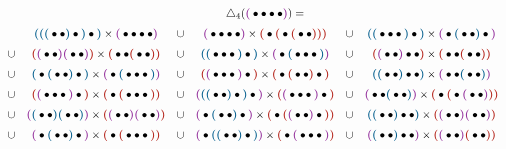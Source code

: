 \documentclass[twoside, 12pt]{amsart}
\theoremstyle{remark}
\begin{document}
\begin{equation*}
  \renewcommand*{\arraystretch}{1.5}
  \begin{matrix}
      & & & & \triangle_4(\purple{\bullet \bullet \bullet \bullet}) =  \\
      &  & \blue{\blue{\blue{\bullet \bullet}\bullet}\bullet} \times \purple{\bullet \bullet \bullet \bullet} 
      & \cup & \purple{\bullet \bullet \bullet \bullet} \times \red{\bullet \red{\bullet \red{\bullet \bullet}}}
      & \cup & \blue{\blue{\bullet \bullet \bullet}\bullet} \times \purple{\bullet \blue{\bullet \bullet}\bullet} \\ 
      & \cup & \red{\purple{\bullet \bullet}\purple{\bullet \bullet}} \times \red{\bullet \bullet\red{\bullet \bullet}} 
      & \cup & \blue{\blue{\bullet \bullet \bullet}\bullet} \times \purple{\bullet \blue{\bullet \bullet \bullet}} 
      & \cup & \red{\purple{\bullet \bullet}\bullet \bullet} \times \red{\bullet \bullet\red{\bullet \bullet}} \\
      & \cup & \blue{\bullet \blue{\bullet \bullet}\bullet} \times \purple{\bullet \blue{\bullet \bullet \bullet}} 
      & \cup & \red{\purple{\bullet \bullet \bullet}\bullet} \times \red{\bullet \red{\bullet \bullet}\bullet}
      & \cup & \blue{\blue{\bullet \bullet}\bullet \bullet} \times \purple{\bullet \bullet \blue{\bullet \bullet}} \\
      & \cup & \red{\purple{\bullet \bullet \bullet}\bullet} \times \red{\bullet \red{\bullet \bullet \bullet}} %
      & \cup & \purple{\blue{\blue{\bullet \bullet}\bullet}\bullet} \times \red{\purple{\bullet \bullet \bullet}\bullet}
      & \cup & \purple{\bullet \bullet\blue{\bullet \bullet}} \times \red{\bullet \red{\bullet \purple{\bullet \bullet}}} \\
      & \cup & \purple{\blue{\bullet \bullet}\blue{\bullet \bullet}} \times \red{\purple{\bullet \bullet}\purple{\bullet \bullet}}
      & \cup & \purple{\bullet \blue{\bullet \bullet}\bullet} \times \red{\bullet \red{\purple{\bullet \bullet}\bullet}}
      & \cup & \blue{\blue{\bullet \bullet}\bullet \bullet} \times \red{\purple{\bullet \bullet}\purple{\bullet \bullet}} \\
      & \cup & \purple{\bullet \blue{\bullet \bullet} \bullet} \times \red{\bullet \red{\bullet \bullet \bullet}}
      & \cup & \purple{\bullet \blue{\blue{\bullet \bullet}\bullet}} \times \red{\bullet \purple{\bullet \bullet\bullet}} 
      & \cup & \purple{\blue{\bullet \bullet}\bullet \bullet} \times \red{\purple{\bullet \bullet}\red{\bullet \bullet}}\\

\end{matrix}
\end{equation*}
\end{document}
